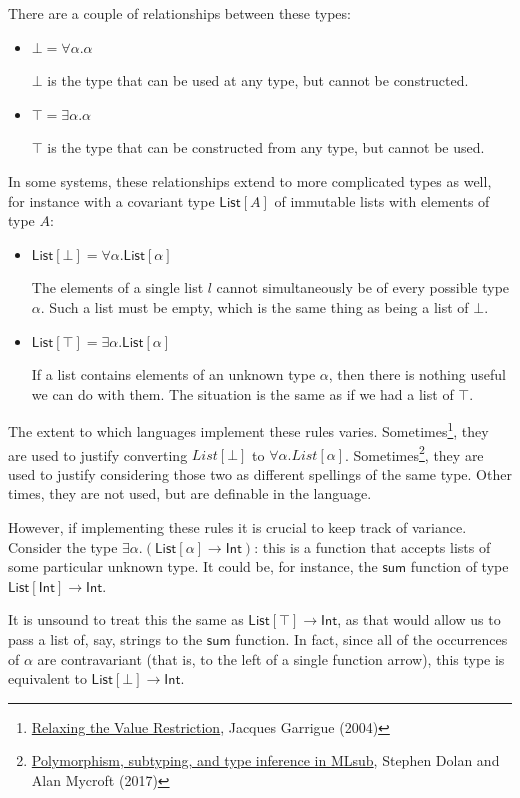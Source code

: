 \documentclass[11pt,oneside]{article}
\newenvironment{ceitemize}{\begin{itemize}}{\end{itemize}}
\begin{document}
There are a couple of relationships between these types:

\begin{ceitemize}
\item \(⊥ = ∀α. α\)

\(⊥\) is the type that can be used at any type, but cannot be constructed.
\item \(⊤ = ∃α. α\)

\(⊤\) is the type that can be constructed from any type, but cannot be used.
\end{ceitemize}

In some systems, these relationships extend to more complicated types as well, for instance with a covariant type \(\mathsf{List}[A]\) of immutable lists with elements of type \(A\):

\begin{ceitemize}
\item \(\mathsf{List}[⊥] = ∀α. \mathsf{List}[α]\)

The elements of a single list \(l\) cannot simultaneously be of every possible type \(α\). Such a list must be empty, which is the same thing as being a list of \(⊥\).
\item \(\mathsf{List}[⊤] = ∃α. \mathsf{List}[α]\)

If a list contains elements of an unknown type \(α\), then there is nothing useful we can do with them. The situation is the same as if we had a list of \(⊤\).
\end{ceitemize}

The extent to which languages implement these rules varies. Sometimes\footnote{\href{https://caml.inria.fr/pub/papers/garrigue-value_restriction-fiwflp04.pdf}{Relaxing the Value Restriction}, Jacques Garrigue (2004)}, they are used to justify converting \(List[⊥]\) to \(∀α.List[α]\). Sometimes\footnote{\href{https://dl.acm.org/doi/abs/10.1145/3009837.3009882}{Polymorphism, subtyping, and type inference in MLsub}, Stephen Dolan and Alan Mycroft (2017)}, they are used to justify considering those two as different spellings of the same type. Other times, they are not used, but are definable in the language.

However, if implementing these rules it is crucial to keep track of variance. Consider the type \(∃α. (\mathsf{List}[α] → \mathsf{Int})\): this is a function that accepts lists of some particular unknown type. It could be, for instance, the \(\mathsf{sum}\) function of type \(\mathsf{List}[\mathsf{Int}] → \mathsf{Int}\).

It is unsound to treat this the same as \(\mathsf{List}[⊤] → \mathsf{Int}\), as that would allow us to pass a list of, say, strings to the \(\mathsf{sum}\) function. In fact, since all of the occurrences of \(α\) are contravariant (that is, to the left of a single function arrow), this type is equivalent to \(\mathsf{List}[⊥] → \mathsf{Int}\).
\end{document}
